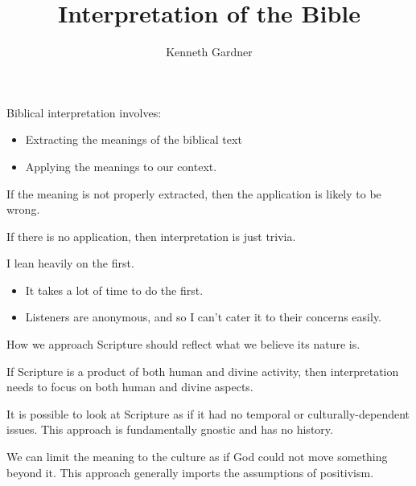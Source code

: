 \documentclass{beamer}
\title{Interpretation of the Bible}
\author{Kenneth Gardner}
\begin{document}
\maketitle

\begin{frame}
  Biblical interpretation involves:\pause
  \begin{itemize}
	\item Extracting the meanings of the biblical text\pause
	\item Applying the meanings to our context.
  \end{itemize}
\end{frame}

\begin{frame}
  If the meaning is not properly extracted, then the application is likely to be wrong.
\end{frame}

\begin{frame}
  If there is no application, then interpretation is just trivia.
\end{frame}

\begin{frame}
  I lean heavily on the first.\pause
  \begin{itemize}
	\item It takes a lot of time to do the first.\pause
	\item Listeners are anonymous, and so I can't cater it to their concerns easily.
  \end{itemize}
\end{frame}

\begin{frame}
  How we approach Scripture should reflect what we believe its nature is.
\end{frame}

\begin{frame}
  If Scripture is a product of both human and divine activity, then interpretation needs to focus on both human and divine aspects.
\end{frame}

\begin{frame}
  It is possible to look at Scripture as if it had no temporal or culturally-dependent issues.
  This approach is fundamentally gnostic and has no history.
\end{frame}

\begin{frame}
  We can limit the meaning to the culture as if God could not move something beyond it.
  This approach generally imports the assumptions of positivism.
\end{frame}
\end{document}
